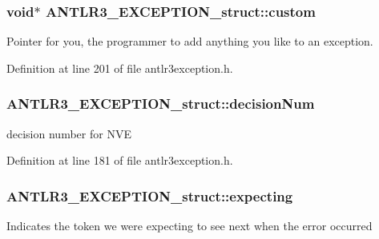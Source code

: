\hypertarget{struct_a_n_t_l_r3___e_x_c_e_p_t_i_o_n__struct_aa85c315545a87eea1688b5301ca03b19}{
\subsubsection[{custom}]{\setlength{\rightskip}{0pt plus 5cm}void$\ast$ A\-N\-T\-L\-R3\-\_\-\-E\-X\-C\-E\-P\-T\-I\-O\-N\-\_\-struct\-::custom}}\label{struct_a_n_t_l_r3___e_x_c_e_p_t_i_o_n__struct_aa85c315545a87eea1688b5301ca03b19}
Pointer for you, the programmer to add anything you like to an exception. 

Definition at line 201 of file antlr3exception.\-h.

\hypertarget{struct_a_n_t_l_r3___e_x_c_e_p_t_i_o_n__struct_ada63a81c5e1e92235b553efc064d8998}{
\subsubsection[{decision\-Num}]{ A\-N\-T\-L\-R3\-\_\-\-E\-X\-C\-E\-P\-T\-I\-O\-N\-\_\-struct\-::decision\-Num}}\label{struct_a_n_t_l_r3___e_x_c_e_p_t_i_o_n__struct_ada63a81c5e1e92235b553efc064d8998}
decision number for N\-V\-E 

Definition at line 181 of file antlr3exception.\-h.

\hypertarget{struct_a_n_t_l_r3___e_x_c_e_p_t_i_o_n__struct_a892ba1e891c6a9c7e9e48428facc5ce4}{
\subsubsection[{expecting}]{ A\-N\-T\-L\-R3\-\_\-\-E\-X\-C\-E\-P\-T\-I\-O\-N\-\_\-struct\-::expecting}}\label{struct_a_n_t_l_r3___e_x_c_e_p_t_i_o_n__struct_a892ba1e891c6a9c7e9e48428facc5ce4}
Indicates the token we were expecting to see next when the error occurred 

